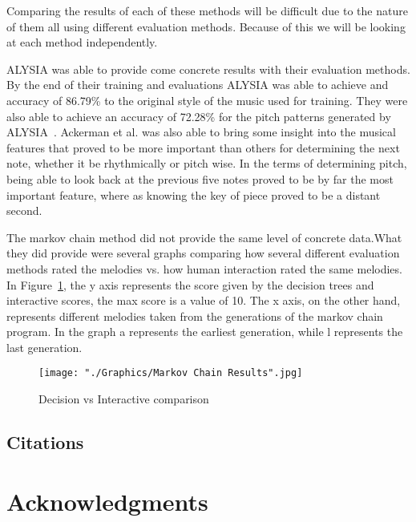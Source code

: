 \documentclass{sig-alternate}
\begin{document}
Comparing the results of each of these methods will be difficult due to the nature of them all using different evaluation methods. Because of this we will be looking at each method independently.

ALYSIA was able to provide come concrete results with their evaluation methods. By the end of their training and evaluations ALYSIA was able to achieve and accuracy of 86.79\% to the original style of the music used for training. They were also able to achieve an accuracy of 72.28\% for the pitch patterns generated by ALYSIA~\cite{Ackerman}. Ackerman et al. was also able to bring some insight into the musical features that proved to be more important than others for determining the next note, whether it be rhythmically or pitch wise. In the terms of determining pitch, being able to look back at the previous five notes proved to be by far the most important feature, where as knowing the key of piece proved to be a distant second. 

The markov chain method did not provide the same level of concrete data.What they did provide were several graphs comparing how several different evaluation methods rated the melodies vs. how human interaction rated the same melodies. In Figure~\ref{fig:markovresults}, the y axis represents the score given by the decision trees and interactive scores, the max score is a value of 10. The x axis, on the other hand, represents different melodies taken from the generations of the markov chain program. In the graph a represents the earliest generation, while l represents the last generation.

\begin{figure}[H]
\texttt{[image: "./Graphics/Markov Chain Results".jpg]}
\caption{Decision vs Interactive comparison}
\label{fig:markovresults}
\end{figure}


\subsection{Citations}
\label{sec:citations}

\section*{Acknowledgments}
\label{sec:acknowledgments}









  
\end{document}
